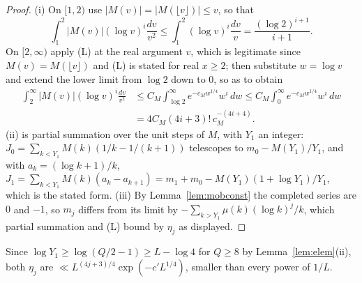 \documentclass[11pt,a4paper]{article}
\theoremstyle{plain}
\theoremstyle{definition}
\theoremstyle{remark}
\begin{document}
\begin{proof}
(i) On $[1,2)$ use $|M(v)|=|M(\lfloor v\rfloor)|\le v$, so that
\[
  \int_{1}^{2}|M(v)|(\log v)^{i}\frac{dv}{v^{2}}
  \le\int_{1}^{2}(\log v)^{i}\frac{dv}v=\frac{(\log2)^{i+1}}{i+1}.
\]
On $[2,\infty)$ apply (L) at the real argument $v$, which is legitimate since $M(v)=M(\lfloor v\rfloor)$ and
(L) is stated for real $x\ge2$; then substitute $w=\log v$ and extend the lower limit from $\log2$ down
to $0$, so as to obtain
\begin{align*}
  \int_{2}^{\infty}|M(v)|(\log v)^{i}\frac{dv}{v^{2}}
   &\le C_{M}\int_{\log2}^{\infty}e^{-c_{M}w^{1/4}}w^{i}\,dw
    \le C_{M}\int_{0}^{\infty}e^{-c_{M}w^{1/4}}w^{i}\,dw\\
   &=4C_{M}(4i+3)!\,c_{M}^{-(4i+4)} .
\end{align*}
(ii) is partial summation over the unit steps of $M$, with $Y_{1}$ an integer:
$J_{0}=\sum_{k<Y_{1}}M(k)(1/k-1/(k+1))$ telescopes to $m_{0}-M(Y_{1})/Y_{1}$, and with
$a_{k}=(\log k+1)/k$, $J_{1}=\sum_{k<Y_{1}}M(k)(a_{k}-a_{k+1})=m_{1}+m_{0}-M(Y_{1})(1+\log Y_{1})/Y_{1}$,
which is the stated form. (iii) By Lemma~\ref{lem:mobconst} the completed series are $0$ and $-1$, so
$m_{j}$ differs from its limit by $-\sum_{k>Y_{1}}\mu(k)(\log k)^{j}/k$, which partial summation and (L)
bound by $\eta_{j}$ as displayed.
\end{proof}

Since $\log Y_{1}\ge\log(Q/2-1)\ge L-\log4$ for $Q\ge8$ by Lemma~\ref{lem:elem}(ii), both $\eta_{j}$ are
$\ll L^{(4j+3)/4}\exp(-c'L^{1/4})$, smaller than every power of $1/L$.
\end{document}
